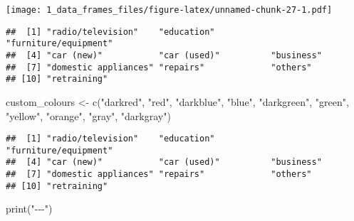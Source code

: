 \documentclass[
]{article}
\newenvironment{Shaded}{\begin{snugshade}}{\end{snugshade}}
\newcommand{\FunctionTok}[1]{\textcolor[rgb]{0.00,0.00,0.00}{#1}}
\newcommand{\NormalTok}[1]{#1}
\newcommand{\OtherTok}[1]{\textcolor[rgb]{0.56,0.35,0.01}{#1}}
\newcommand{\SpecialCharTok}[1]{\textcolor[rgb]{0.00,0.00,0.00}{#1}}
\newcommand{\StringTok}[1]{\textcolor[rgb]{0.31,0.60,0.02}{#1}}
\begin{document}
\texttt{[image: 1\_data\_frames\_files/figure-latex/unnamed-chunk-27-1.pdf]}

\begin{Shaded}
\end{Shaded}

\begin{verbatim}
##  [1] "radio/television"    "education"           "furniture/equipment"
##  [4] "car (new)"           "car (used)"          "business"           
##  [7] "domestic appliances" "repairs"             "others"             
## [10] "retraining"
\end{verbatim}

\begin{Shaded}
\begin{Highlighting}[]
\NormalTok{custom\_colours }\OtherTok{\textless{}{-}} \FunctionTok{c}\NormalTok{(}\StringTok{"darkred"}\NormalTok{, }\StringTok{"red"}\NormalTok{, }\StringTok{"darkblue"}\NormalTok{, }\StringTok{"blue"}\NormalTok{, }\StringTok{"darkgreen"}\NormalTok{, }\StringTok{"green"}\NormalTok{, }\StringTok{"yellow"}\NormalTok{, }\StringTok{"orange"}\NormalTok{, }\StringTok{"gray"}\NormalTok{, }\StringTok{"darkgray"}\NormalTok{)}
\end{Highlighting}
\end{Shaded}

\begin{Shaded}
\end{Shaded}

\begin{verbatim}
##  [1] "radio/television"    "education"           "furniture/equipment"
##  [4] "car (new)"           "car (used)"          "business"           
##  [7] "domestic appliances" "repairs"             "others"             
## [10] "retraining"
\end{verbatim}

\begin{Shaded}
\begin{Highlighting}[]
\FunctionTok{print}\NormalTok{(}\StringTok{"{-}{-}{-}"}\NormalTok{)}
\end{Highlighting}
\end{Shaded}
\end{document}
